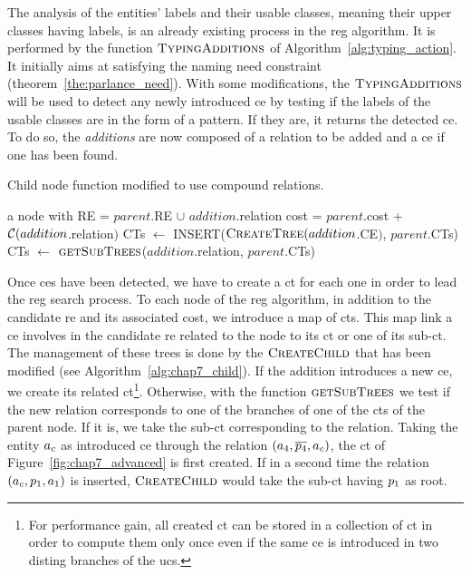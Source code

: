 The analysis of the entities' labels and their usable classes, meaning their upper classes having labels, is an already existing process in the \acrshort{reg} algorithm. It is performed by the function $\textsc{TypingAdditions}$ of Algorithm~\ref{alg:typing_action}. It initially aims at satisfying the naming need constraint (theorem~\ref{the:parlance_need}). With some modifications, the $\textsc{TypingAdditions}$ will be used to detect any newly introduced \acrshort{ce} by testing if the labels of the usable classes are in the form of a pattern. If they are, it returns the detected \acrshort{ce}. To do so, the \textit{additions} are now composed of a relation to be added and a \acrshort{ce} if one has been found.

\begin{algorithm}[b!]
\caption{\label{alg:chap7_child} Child node function modified to use compound relations.}
\begin{algorithmic}
    \State \Return a node with
    \State RE = $parent$.RE $\cup$ $addition$.relation
    \State cost = $parent$.cost + $\mathcal{C}(addition$.relation$)$
    	\State CTs $\leftarrow$ INSERT($\textsc{CreateTree}(addition$.CE$)$, $parent$.CTs)
    \Else
    	\State CTs $\leftarrow$ $\textsc{getSubTrees}$($addition$.relation, $parent$.CTs)
    \EndIf
\EndFunction
\end{algorithmic}
\end{algorithm}

Once \acrshort{ce}s have been detected, we have to create a \acrfull{ct} for each one in order to lead the \acrshort{reg} search process. To each node of the \acrshort{reg} algorithm, in addition to the candidate \acrshort{re} and its associated cost, we introduce a map of \acrshort{ct}s. This map link a \acrshort{ce} involves in the candidate \acrshort{re} related to the node to its \acrshort{ct} or one of its sub-\acrshort{ct}. The management of these trees is done by the $\textsc{CreateChild}$ that has been modified (see Algorithm~\ref{alg:chap7_child}). If the addition introduces a new \acrshort{ce}, we create its related \acrshort{ct}\footnote{For performance gain, all created \acrshort{ct} can be stored in a collection of \acrshort{ct} in order to compute them only once even if the same \acrshort{ce} is introduced in two disting branches of the \acrshort{ucs}.}. Otherwise, with the function $\textsc{getSubTrees}$ we test if the new relation corresponds to one of the branches of one of the \acrshort{ct}s of the parent node. If it is, we take the sub-\acrshort{ct} corresponding to the relation. Taking the entity $a_c$ as introduced \acrshort{ce} through the relation $(a_4, \overline{p_4}, a_c)$, the \acrshort{ct} of Figure~\ref{fig:chap7_advanced} is first created. If in a second time the relation $(a_c, p_1, a_1)$ is inserted, $\textsc{CreateChild}$ would take the sub-\acrshort{ct} having $p_1$ as root.

